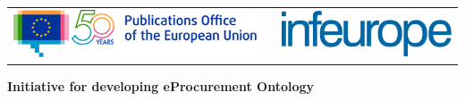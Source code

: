 

\newcommand{\DelAcronym}{ePO}
\newcommand{\DelTitle}{{eProcurement} UML conceptual model conventions}
\newcommand{\DelNumber}{WP 1.2}
\newcommand{\DelVersion}{1.0}
\newcommand{\DelAuthor}{Eugeniu Costetchi}
\newcommand{\DelDate}{17 April 2020}
\newcommand{\DelFilename}{wp1-2-uml-conventions}
\newcommand{\DelInitiative}{Initiative for developing eProcurement Ontology}

\pagestyle{empty}


\begin{titlepage}
\begin{center}

\begin{center}
	\begin{center}
		\setlength{\tabcolsep}{0pt}
		\begin{tabular}{>{\raggedleft}m{3.5cm}>{\centering}m{\dimexpr\textwidth - 8cm\relax}>{\raggedright}m{3.5cm}}
			\includegraphics[width=1.15\linewidth]{images/logos/OP-50years-EN}%
			&%
			&%
			\includegraphics[width=\linewidth]{images/logos/infeurope-blue-logo} %
		\end{tabular}
	\end{center}


  \vspace{2mm}

  \end{center}
  \vspace{4cm}
  \textbf{{\large \DelInitiative\\}}
  \vspace{2cm}
  

\end{center}
\end{titlepage}
